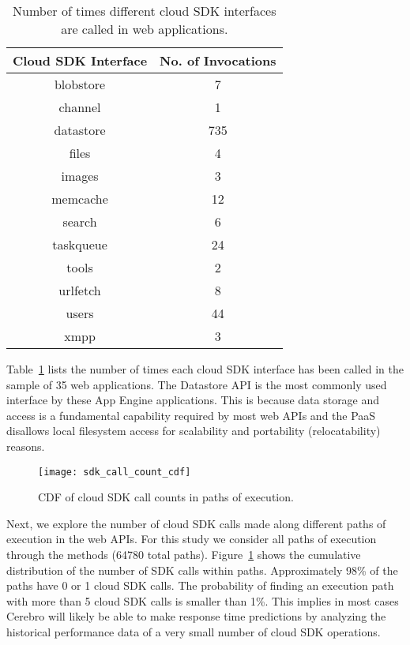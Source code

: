 \begin{table}[htdp]
\caption{Number of times different cloud SDK interfaces are called in web applications.}
\begin{center}
\begin{tabular}{|c|c|}
\hline
Cloud SDK Interface & No. of Invocations \\ \hline
blobstore & 7 \\ \hline
channel & 1 \\ \hline
datastore & 735 \\ \hline
files & 4 \\ \hline
images & 3 \\ \hline
memcache & 12 \\ \hline
search & 6 \\ \hline
taskqueue & 24 \\ \hline
tools & 2 \\ \hline
urlfetch & 8 \\ \hline
users & 44 \\ \hline
xmpp & 3 \\ \hline
\end{tabular}
\end{center}
\label{tab:sdk_call_counts}
\end{table}

Table~\ref{tab:sdk_call_counts} lists the number of times each cloud 
SDK interface has been called in the sample of
35 web applications. The Datastore API is the most commonly used interface 
by these App Engine applications.
This is because data storage and access is a fundamental 
capability required by most web APIs and the PaaS
disallows local filesystem
access for scalability and portability (relocatability) reasons.

\begin{figure}
\centering
\texttt{[image: sdk\_call\_count\_cdf]}
\caption{CDF of cloud SDK call counts in paths of execution.}
\label{fig:sdk_call_count_cdf}
\end{figure}

Next, we explore the number of cloud SDK calls made along 
different paths of execution in the web APIs. For this study
we consider all paths of execution through the methods (64780 total paths). 
Figure~\ref{fig:sdk_call_count_cdf}
shows the cumulative distribution of the number of SDK calls within paths.
Approximately 98\% of the paths have 0 or 1 cloud SDK calls. 
The probability of finding an execution path with more than
5 cloud SDK calls is smaller than 1\%.
This implies in most cases Cerebro will likely be able to make response 
time predictions by analyzing the
historical performance data of a very small number of cloud SDK operations.

